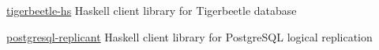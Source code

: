 
\begin{cvskills}

  \cvskill
    {\href{https://github.com/agentultra/tigerbeetle-hs}{tigerbeetle-hs}} %
    {Haskell client library for Tigerbeetle database}

  \cvskill
    {\href{https://github.com/agentultra/postgresql-replicant}{postgresql-replicant}} %
    {Haskell client library for PostgreSQL logical replication}

\end{cvskills}
